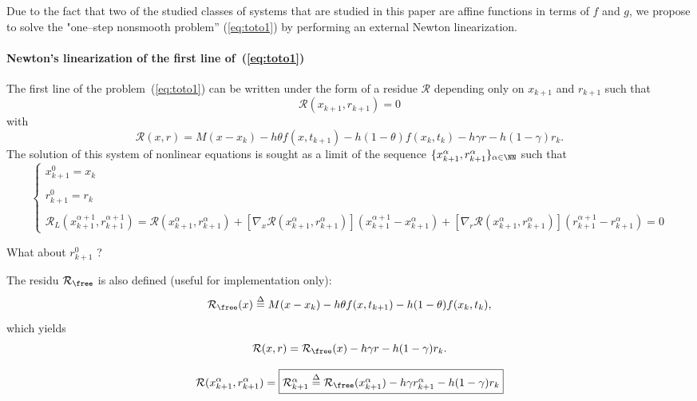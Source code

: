 
Due to the fact that  two of the  studied classes of systems that are studied in this paper are affine functions in terms of $f$ and $g$, we propose to solve the "one--step nonsmooth problem'' (\ref{eq:toto1}) by performing an external Newton linearization.

 \paragraph{Newton's linearization of the first line of~(\ref{eq:toto1})} The first line of the  problem~(\ref{eq:toto1}) can be written under the form of a residue $\mathcal R$ depending only on $x_{k+1}$ and $r_{k+1}$ such that 
\begin{equation}
  \label{eq:NL3}
  \mathcal R (x_{k+1},r _{k+1}) =0
\end{equation}
with 
\begin{equation}
\mathcal R(x,r) = M(x - x_{k}) -h\theta f( x , t_{k+1}) - h(1-\theta)f(x_k,t_k) - h\gamma r
- h(1-\gamma)r_k.
\end{equation}
The solution of this system of nonlinear equations is sought as a limit of the sequence $\{ x^{\alpha}_{k+1},r^{\alpha}_{k+1} \}_{\alpha \in \NN}$ such that
 \begin{equation}
   \label{eq:NL7}
   \begin{cases}
     x^{0}_{k+1} = x_k \\ \\
     r^{0}_{k+1} = r_k \\ \\
     \mathcal R_L( x^{\alpha+1}_{k+1},r^{\alpha+1}_{k+1}) = \mathcal
     R(x^{\alpha}_{k+1},r^{\alpha}_{k+1})  + \left[ \nabla_{x} \mathcal
     R(x^{\alpha}_{k+1},r^{\alpha}_{k+1})\right] (x^{\alpha+1}_{k+1}-x^{\alpha}_{k+1} ) +
     \left[ \nabla_{r} \mathcal R(x^{\alpha}_{k+1},r^{\alpha}_{k+1})\right] (r^{\alpha+1}_{k+1} - r^{\alpha}_{k+1} ) =0
 \end{cases}
\end{equation}
\begin{ndrva}
  What about $r^0_{k+1}$ ?
\end{ndrva}

The residu \free $\mathcal R _{\free}$ is also defined (useful for implementation only):
\[\mathcal R _{\free}(x) \stackrel{\Delta}{=}  M(x - x_{k}) -h\theta f( x , t_{k+1}) - h(1-\theta)f(x_k,t_k),\]
which yields
\[\mathcal R (x,r) = \mathcal R _{\free}(x)   - h\gamma r - h(1-\gamma)r_k.\]

\begin{equation}
  \mathcal R (x^{\alpha}_{k+1},r^{\alpha}_{k+1}) = \fbox{$\mathcal R^{\alpha}_{k+1} \stackrel{\Delta}{=}  \mathcal R
_{\free}(x^{\alpha}_{k+1})  - h\gamma r^{\alpha}_{k+1} - h(1-\gamma)r_k$}\label{eq:rfree-1}
\end{equation}

